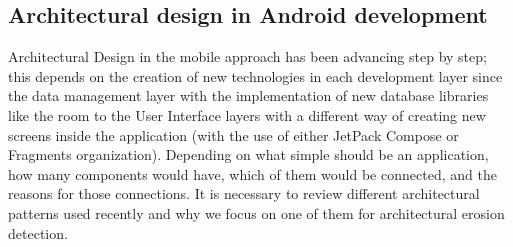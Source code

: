 \subsection{Architectural design in Android development}
Architectural Design in the mobile approach has been advancing step by step; this depends on the creation of new technologies in each development layer since the data management layer with the implementation of new database libraries like the room to the User Interface layers with a different way of creating new screens inside the application (with the use of either JetPack Compose or Fragments organization).
Depending on what simple should be an application, how many components would have, which of them would be connected, and the reasons for those connections. It is necessary to review different architectural patterns used recently and why we focus on one of them for architectural erosion detection.


